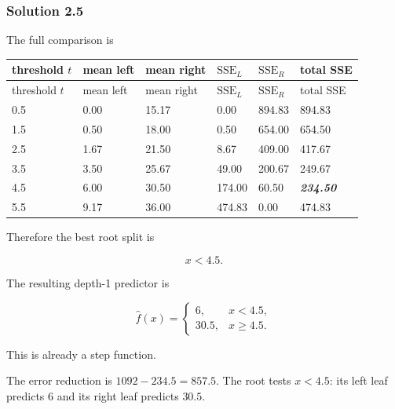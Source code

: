 \documentclass[10pt]{article}
\begin{document}
\subsubsection*{Solution 2.5}
The full comparison is

\begingroup
\small
\setlength{\tabcolsep}{4pt}
\begin{longtable}{l|l|l|l|l|l}
threshold $t$ & mean left & mean right & $\mathrm{SSE}_L$ & $\mathrm{SSE}_R$ & total SSE \\
\hline
\endfirsthead
threshold $t$ & mean left & mean right & $\mathrm{SSE}_L$ & $\mathrm{SSE}_R$ & total SSE \\
\hline
\endhead
0.5 & 0.00 & 15.17 & 0.00 & 894.83 & 894.83 \\[1.5pt]
1.5 & 0.50 & 18.00 & 0.50 & 654.00 & 654.50 \\[1.5pt]
2.5 & 1.67 & 21.50 & 8.67 & 409.00 & 417.67 \\[1.5pt]
3.5 & 3.50 & 25.67 & 49.00 & 200.67 & 249.67 \\[1.5pt]
4.5 & 6.00 & 30.50 & 174.00 & 60.50 & \textbf{\textit{234.50}} \\[1.5pt]
5.5 & 9.17 & 36.00 & 474.83 & 0.00 & 474.83 \\[1.5pt]
\end{longtable}
\endgroup
Therefore the best root split is

\[
x<4.5.
\]

The resulting depth-1 predictor is

\[
\hat f(x)=
\begin{cases}
6, & x<4.5,\\
30.5, & x\geq4.5.
\end{cases}
\]

This is already a step function.

The error reduction is $1092-234.5=857.5$. The root tests $x<4.5$: its
left leaf predicts $6$ and its right leaf predicts $30.5$.
\end{document}
